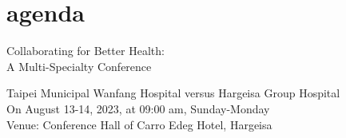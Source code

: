 \section{agenda}

\begin{center} %
    
\begin{tikzfigure}[]


\hspace{2cm}
%

\end{tikzfigure}

\end{center}


\fontsize{20}{24}  Collaborating for Better Health: \\
A Multi-Specialty Conference \\
 \par
\vspace{0.3cm}

\fontsize{12}{13} \sc
Taipei Municipal Wanfang Hospital versus Hargeisa Group Hospital\\
On August 13-14, 2023, at 09:00 am, Sunday-Monday \\
Venue: Conference Hall of Carro Edeg Hotel, Hargeisa
\par






